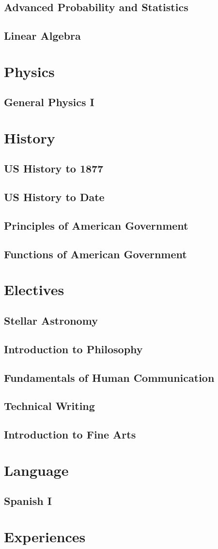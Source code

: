 \documentclass[11pt]{book}
\begin{document}
\chapter{Advanced Probability and Statistics}
\chapter{Linear Algebra}


\part{Physics}
\chapter{General Physics I}


\part{History}
\chapter{US History to 1877}
\chapter{US History to Date}
\chapter{Principles of American Government}
\chapter{Functions of American Government}

\part{Electives}
\chapter{Stellar Astronomy}
\chapter{Introduction to Philosophy}
\chapter{Fundamentals of Human Communication}
\chapter{Technical Writing}
\chapter{Introduction to Fine Arts}


\part{Language}
\chapter{Spanish I}

\part{Experiences}

\end{document}
